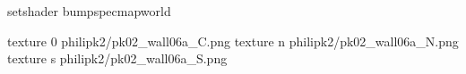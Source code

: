 setshader bumpspecmapworld

texture 0 philipk2/pk02_wall06a_C.png
texture n philipk2/pk02_wall06a_N.png
texture s philipk2/pk02_wall06a_S.png

